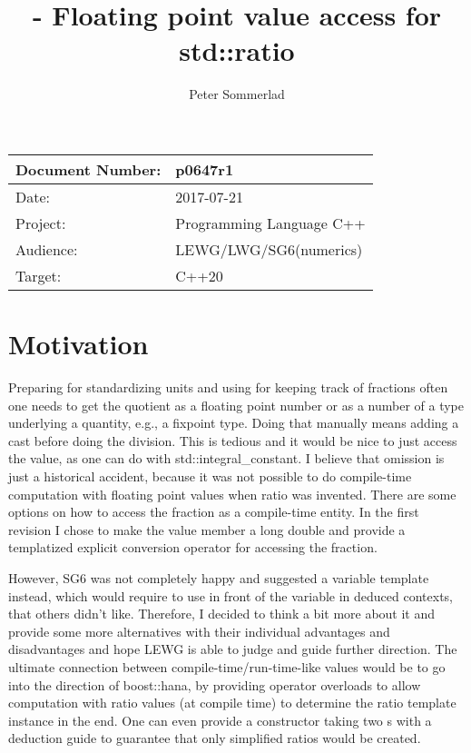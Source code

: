 \documentclass[ebook,11pt,article]{memoir}
\title{\papernumber{} - Floating point value access for std::ratio}
\author{Peter Sommerlad}
\date{\paperdate}                        %
\newcommand{\papernumber}{p0647r1}
\newcommand{\paperdate}{2017-07-21}
\begin{document}
\maketitle
\begin{tabular}[t]{|l|l|}\hline 
Document Number:& \papernumber  \\\hline
Date: & \paperdate \\\hline
Project: & Programming Language C++\\\hline 
Audience: & LEWG/LWG/SG6(numerics)\\\hline
Target: & C++20\\\hline
\end{tabular}

\chapter{Motivation}

Preparing for standardizing units and using  for keeping track of fractions often one needs to get the quotient as a floating point number or as a number of a type underlying a quantity, e.g., a fixpoint type. Doing that manually means adding a cast before doing the division. This is tedious and it would be nice to just access the value, as one can do with std::integral_constant. I believe that omission is just a historical accident, because it was not possible to do compile-time computation with floating point values when ratio was invented. There are some options on how to access the fraction as a compile-time entity. In the first revision I chose to make the value member a long double and provide a templatized explicit conversion operator for accessing the fraction.

However, SG6 was not completely happy and suggested a variable template instead, which would require to use  in front of the variable in deduced contexts, that others didn't like. Therefore, I decided to think a bit more about it and provide some more alternatives with their individual advantages and disadvantages and hope LEWG is able to judge and guide further direction. The ultimate connection between compile-time/run-time-like values would be to go into the direction of boost::hana, by providing operator overloads to allow computation with ratio values (at compile time) to determine the ratio template instance in the end. One can even provide a constructor taking two s with a deduction guide to guarantee that only simplified ratios would be created.
\end{document}
